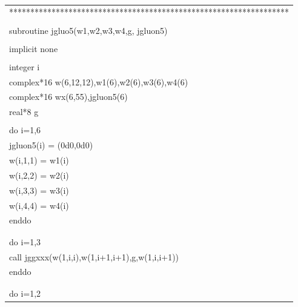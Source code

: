 \documentclass[a4paper,11pt]{article}
\begin{document}
\begin{center}
\vspace{3em}
\small
{\tt
\begin{supertabular}{l}
******************************************************************\\\\
     \hspace{0.5em} subroutine jgluo5(w1,w2,w3,w4,g, jgluon5) \\
\\
     \hspace{0.5em} implicit none\\
\\
     \hspace{0.5em} integer i\\
     \hspace{0.5em} complex*16 w(6,12,12),w1(6),w2(6),w3(6),w4(6)\\
     \hspace{0.5em} complex*16 wx(6,55),jgluon5(6)   \\
     \hspace{0.5em} real*8 g\\
\\
     \hspace{0.5em} do i=1,6\\
     \hspace{1em}    jgluon5(i) = (0d0,0d0)\\
     \hspace{1em}    w(i,1,1) = w1(i)\\
     \hspace{1em}    w(i,2,2) = w2(i)\\
     \hspace{1em}    w(i,3,3) = w3(i)\\
     \hspace{1em}    w(i,4,4) = w4(i)\\
     \hspace{0.5em} enddo\\
     \\
\\
      \hspace{0.5em} do i=1,3\\
      \hspace{1em}   call jggxxx(w(1,i,i),w(1,i+1,i+1),g,w(1,i,i+1))\\
      \hspace{0.5em} enddo\\
\\
\\
       \hspace{0.5em} do i=1,2 \\

\end{supertabular}}
\end{center}
\end{document}
